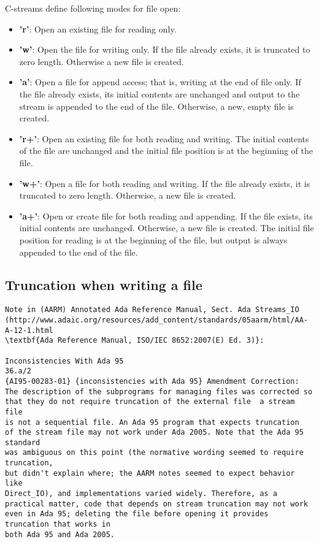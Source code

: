 \documentclass[a4paper,10pt]{article}
\begin{document}
C-streams define following modes for file open:
\begin{itemize}
\item \textbf{'r'}: Open an existing file for reading only. 
\item \textbf{'w'}: Open the file for writing only. If the file already exists, it is truncated to zero length. Otherwise a new file is created. 
\item \textbf{'a'}: Open a file for append access; that is, writing at the end of file only. If the file already exists, its initial contents are unchanged and output to the stream is appended to the end of the file. Otherwise, a new, empty file is created. 
\item \textbf{'r+'}: Open an existing file for both reading and writing. The initial contents of the file are unchanged and the initial file position is at the beginning of the file. 
\item \textbf{'w+'}: Open a file for both reading and writing. If the file already exists, it is truncated to zero length. Otherwise, a new file is created. 
\item \textbf{'a+'}: Open or create file for both reading and appending. If the file exists, its initial contents are unchanged. Otherwise, a new file is created. The initial file position for reading is at the beginning of the file, but output is always appended to the end of the file. 
\end{itemize}


\subsection{Truncation when writing a file}
\label{sec:truncatefile}

\begin{Verbatim}
Note in (AARM) Annotated Ada Reference Manual, Sect. Ada Streams_IO
(http://www.adaic.org/resources/add_content/standards/05aarm/html/AA-A-12-1.html
\textbf{Ada Reference Manual, ISO/IEC 8652:2007(E) Ed. 3)}:

Inconsistencies With Ada 95
36.a/2
{AI95-00283-01} {inconsistencies with Ada 95} Amendment Correction: 
The description of the subprograms for managing files was corrected so 
that they do not require truncation of the external file  a stream file 
is not a sequential file. An Ada 95 program that expects truncation 
of the stream file may not work under Ada 2005. Note that the Ada 95 standard 
was ambiguous on this point (the normative wording seemed to require truncation, 
but didn't explain where; the AARM notes seemed to expect behavior like 
Direct_IO), and implementations varied widely. Therefore, as a 
practical matter, code that depends on stream truncation may not work 
even in Ada 95; deleting the file before opening it provides truncation that works in 
both Ada 95 and Ada 2005. 
\end{Verbatim}
\end{document}
